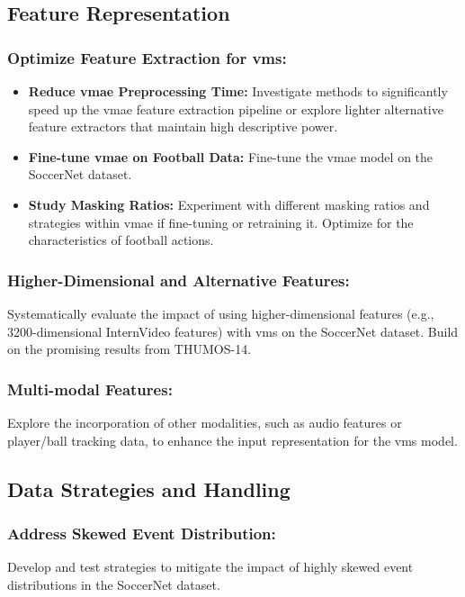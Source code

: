 \subsection{Feature Representation}

\subsubsection{Optimize Feature Extraction for \acrshort{vms}:}
    \begin{itemize}
        \item \textbf{Reduce \acrshort{vmae} Preprocessing Time:} Investigate methods to significantly speed up the \acrshort{vmae} feature extraction pipeline or explore lighter alternative feature extractors that maintain high descriptive power.
        \item \textbf{Fine-tune \acrshort{vmae} on Football Data:} Fine-tune the \acrshort{vmae} model on the SoccerNet dataset.
        \item \textbf{Study Masking Ratios:} Experiment with different masking ratios and strategies within \acrshort{vmae} if fine-tuning or retraining it. Optimize for the characteristics of football actions.
    \end{itemize}
    
\subsubsection{Higher-Dimensional and Alternative Features:} 
Systematically evaluate the impact of using higher-dimensional features (e.g., 3200-dimensional InternVideo features) with \acrshort{vms} on the SoccerNet dataset. Build on the promising results from THUMOS-14.

\subsubsection{Multi-modal Features:} 
Explore the incorporation of other modalities, such as audio features or player/ball tracking data, to enhance the input representation for the \acrshort{vms} model.

\subsection{Data Strategies and Handling}

\subsubsection{Address Skewed Event Distribution:} Develop and test strategies to mitigate the impact of highly skewed event distributions in the SoccerNet dataset.

